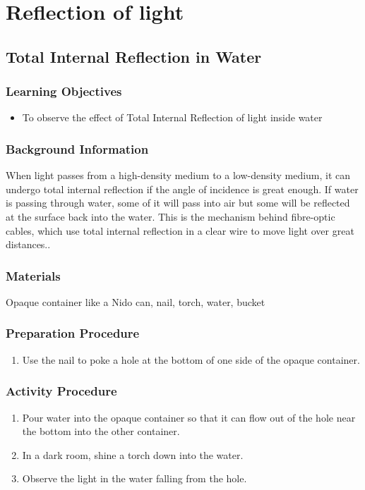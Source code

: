 \section{Reflection of light}

\subsection{Total Internal Reflection in Water}

\subsubsection*{Learning Objectives}
\begin{itemize}
\item{To observe the effect of Total Internal Reflection of light inside water}
\end{itemize}

\subsubsection*{Background Information}
When light passes from a high-density medium to a low-density medium, it can undergo total internal reflection if the angle of incidence is great enough.  If water is passing through water, some of it will pass into air but some will be reflected at the surface back into the water.  This is the mechanism behind fibre-optic cables, which use total internal reflection in a clear wire to move light over great distances..

\subsubsection*{Materials}
Opaque container like a Nido can, nail, torch, water, bucket

\subsubsection*{Preparation Procedure}
\begin{enumerate}
\item{Use the nail to poke a hole at the bottom of one side of the opaque container.}
\end{enumerate}

\subsubsection*{Activity Procedure}
\begin{enumerate}
\item{Pour water into the opaque container so that it can flow out of the hole near the bottom into the other container.}
\item{In a dark room, shine a torch down into the water.}
\item{Observe the light in the water falling from the hole.}
\end{enumerate}

